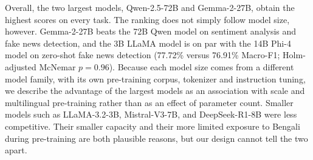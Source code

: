 \documentclass[10pt,letterpaper]{article}
\begin{document}
Overall, the two largest models, Qwen-2.5-72B and Gemma-2-27B, obtain the highest scores on every task. The ranking does not simply follow model size, however. Gemma-2-27B beats the 72B Qwen model on sentiment analysis and fake news detection, and the 3B LLaMA model is on par with the 14B Phi-4 model on zero-shot fake news detection (77.72\% versus 76.91\% Macro-F1; Holm-adjusted McNemar $p = 0.96$). Because each model size comes from a different model family, with its own pre-training corpus, tokenizer and instruction tuning, we describe the advantage of the largest models as an association with scale and multilingual pre-training rather than as an effect of parameter count. Smaller models such as LLaMA-3.2-3B, Mistral-V3-7B, and DeepSeek-R1-8B were less competitive. Their smaller capacity and their more limited exposure to Bengali during pre-training are both plausible reasons, but our design cannot tell the two apart.
\end{document}
